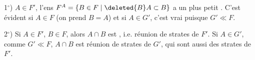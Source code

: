 1$^\circ$) \deleted{$\forall$} $A\in F'$, l'ens $F^A=\{B\in F\mid \deleted{B}A\subset B\}$ a un plus petit . C'est évident si $A\in F$  (on prend $B=A$) et si $A\in G'$, c'est vrai puisque $G'\ll F$.

2$^\circ$) Si $A\in F'$, $B\in F$, alors $A\cap B$ est 
, i.e. réunion de strates de $F'$. Si $A\in G'$, comme $G'\ll F$, $A\cap B$ est réunion de strates de $G'$, qui sont aussi des strates de $F'$.
